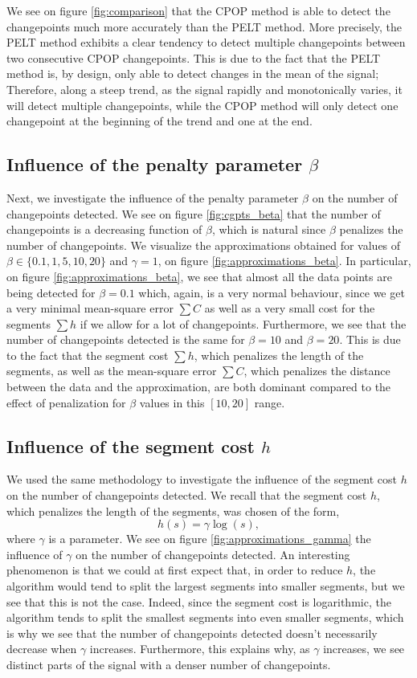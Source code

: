 \documentclass[11pt]{article}
\begin{document}
We see on figure \ref{fig:comparison} that the CPOP method is able to detect the changepoints much more accurately than the PELT method. More precisely, the PELT method exhibits a clear tendency to detect multiple changepoints between two consecutive CPOP changepoints. This is due to the fact that the PELT method is, by design, only able to detect changes in the mean of the signal; Therefore, along a steep trend, as the signal rapidly and monotonically varies, it will detect multiple changepoints, while the CPOP method will only detect one changepoint at the beginning of the trend and one at the end.

\subsection{Influence of the penalty parameter $\beta$}
Next, we investigate the influence of the penalty parameter $\beta$ on the number of changepoints detected. We see on figure \ref{fig:cgpts_beta} that the number of changepoints is a decreasing function of $\beta$, which is natural since $\beta$ penalizes the number of changepoints. We visualize the approximations obtained for values of $\beta \in \{0.1, 1, 5, 10, 20\}$ and $\gamma = 1$, on figure \ref{fig:approximations_beta}.
\jump
In particular, on figure \ref{fig:approximations_beta}, we see that almost all the data points are being detected for $\beta=0.1$ which, again, is a very normal behaviour, since we get a very minimal mean-square error $\sum C$ as well as a very small cost for the segments $\sum h$ if we allow for a lot of changepoints.
\jump
Furthermore, we see that the number of changepoints detected is the same for $\beta = 10$ and $\beta = 20$. This is due to the fact that the segment cost $\sum h$, which penalizes the length of the segments, as well as the mean-square error $\sum C$, which penalizes the distance between the data and the approximation, are both dominant compared to the effect of penalization for $\beta$ values in this $[10,20]$ range.

\subsection{Influence of the segment cost $h$}
We used the same methodology to investigate the influence of the segment cost $h$ on the number of changepoints detected. We recall that the segment cost $h$, which penalizes the length of the segments, was chosen of the form,
$$ h(s) = \gamma \log(s), $$ where $\gamma$ is a parameter.
\jump
We see on figure \ref{fig:approximations_gamma} the influence of $\gamma$ on the number of changepoints detected. An interesting phenomenon is that we could at first expect that, in order to reduce $h$, the algorithm would tend to split the largest segments into smaller segments, but we see that this is not the case. Indeed, since the segment cost is logarithmic, the algorithm tends to split the smallest segments into even smaller segments, which is why we see that the number of changepoints detected doesn't necessarily decrease when $\gamma$ increases. Furthermore, this explains why, as $\gamma$ increases, we see distinct parts of the signal with a denser number of changepoints.
\end{document}
